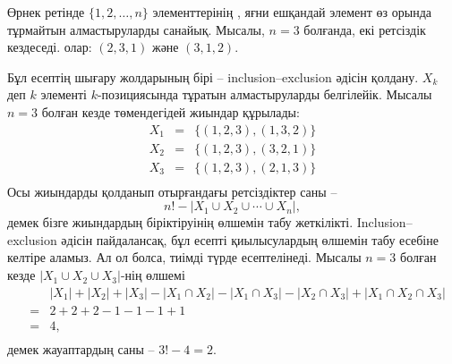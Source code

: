 
Өрнек ретінде $\{1,2,\ldots,n\}$ элементтерінің , яғни ешқандай элемент өз орында тұрмайтын алмастыруларды санайық.
Мысалы,  $n=3$ болғанда, екі ретсіздік кездеседі. олар: $(2,3,1)$ және $(3,1,2)$.


Бұл есептің шығару жолдарының бірі -- inclusion–exclusion әдісін қолдану. %
$X_k$ деп $k$ элементі $k$-позициясында тұратын алмастыруларды белгілейік.
Мысалы $n=3$ болған кезде төмендегідей жиындар құрылады:
\[
\begin{array}{lcl}
X_1 & = & \{(1,2,3),(1,3,2)\} \\
X_2 & = & \{(1,2,3),(3,2,1)\} \\
X_3 & = & \{(1,2,3),(2,1,3)\} \\
\end{array}
\]
Осы жиындарды қолданып отырғандағы ретсіздіктер саны --
\[ n! - |X_1 \cup X_2 \cup \cdots \cup X_n|, \]
демек бізге жиындардың біріктіруінің өлшемін табу жеткілікті.
Inclusion–exclusion әдісін пайдалансақ, бұл есепті қиылысулардың
өлшемін табу есебіне келтіре аламыз. Ал ол болса,
тиімді түрде есептелінеді. Мысалы $n=3$ болған кезде
$|X_1 \cup X_2 \cup X_3|$-нің өлшемі 
\[
\begin{array}{lcl}
 & & |X_1| + |X_2| + |X_3| - |X_1 \cap X_2|  - |X_1 \cap X_3|  - |X_2 \cap X_3| + |X_1 \cap X_2 \cap X_3| \\
 & = & 2+2+2-1-1-1+1 \\
 & = & 4, \\
\end{array}
\]
демек жауаптардың саны -- $3!-4=2$.


